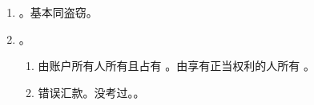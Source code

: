 \begin{enumerate}
\begin{enumerate}
\begin{enumerate}
                  \item 产生债务后不想付费。
                        \begin{enumerate}
                          \item 欺骗手段。。\sjt 都是“假”逃单行为。
                          \item 平和手段。。
                                \begin{itemize}
                                  \item 多数说。不构成。\yi 跑路没有转移占有效果。\er 刑法谦抑性。该现象太普遍，监狱关不下。
                                  \item 少数说。符合要件，构成盗窃。
                                \end{itemize}
                        \end{enumerate}
                \end{enumerate}
          \item 电力与电费。
                \begin{enumerate}
                  \item {}。
                  \item {}。
                  \item {}。
                \end{enumerate}
          \item {}。
                \begin{enumerate}
                  \item {}。
                  \item 非法充值。
                  \item 诈骗电信工作人员。。
                \end{enumerate}
        \end{enumerate}
  \item {}。基本同盗窃。
  \item {}。
        \begin{enumerate}
          \item \yi 由账户所有人所有且占有 \yjt {}。\er 由享有正当权利的人所有 \yjt {}。
          \item 错误汇款。没考过。。

\end{enumerate}
\end{enumerate}
